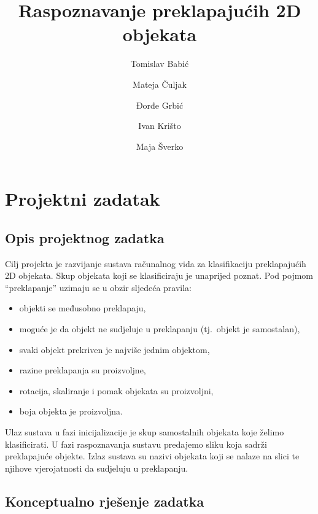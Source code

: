 \documentclass[lmodern, utf8, seminar, numeric]{fer}
\begin{document}
\title{Raspoznavanje preklapajućih 2D objekata}

\author{Tomislav Babić \and Mateja Čuljak \and Đorđe Grbić \and Ivan Krišto \and Maja Šverko}

\maketitle

\tableofcontents


\chapter{Projektni zadatak}

\section{Opis projektnog zadatka}

Cilj projekta je razvijanje sustava računalnog vida za klasifikaciju preklapajućih 2D objekata. Skup objekata koji se klasificiraju je unaprijed poznat. Pod pojmom ``preklapanje'' uzimaju se u obzir sljedeća pravila:
\begin{itemize}
\item objekti se međusobno preklapaju,
\item moguće je da objekt ne sudjeluje u preklapanju (tj.\ objekt je samostalan),
\item svaki objekt prekriven je najviše jednim objektom,
\item razine preklapanja su proizvoljne,
\item rotacija, skaliranje i pomak objekata su proizvoljni,
\item boja objekta je proizvoljna.
\end{itemize}
Ulaz sustava u fazi inicijalizacije je skup samostalnih objekata koje želimo klasificirati. U fazi raspoznavanja sustavu predajemo sliku koja sadrži preklapajuće objekte. Izlaz sustava su nazivi objekata koji se nalaze na slici te njihove vjerojatnosti da sudjeluju u preklapanju.

\section{Konceptualno rješenje zadatka}
\end{document}

